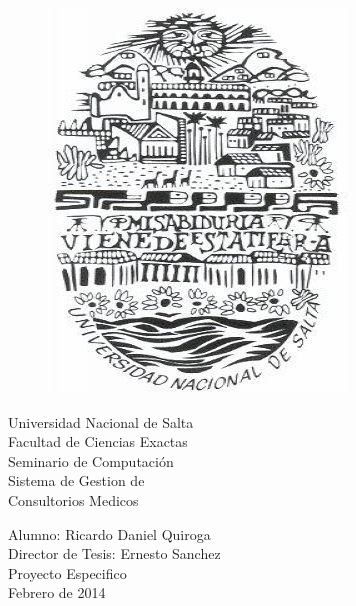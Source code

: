 \documentclass[a4paper,10pt]{report}
\begin{document}
\begin{titlepage}


\begin{center}
    \begin{figure}
        \begin{center}
        \includegraphics[scale=0.5]{resourse/logo-UNSa.jpg}
        \end{center}
    \end{figure} 
\end{center}


\begin{center}
    \LARGE Universidad Nacional de Salta \\
    Facultad de Ciencias Exactas \\
    Seminario de Computaci\'on \\ [2.3cm]
    

    {\fontsize{35}{35} \selectfont 
    Sistema de Gestion de \\ Consultorios Medicos \\[2.3cm] }

\end{center}



\begin{flushright}
    \Large Alumno: Ricardo Daniel Quiroga \\
    Director de Tesis: Ernesto Sanchez \\
    Proyecto Especifico \\ 
    Febrero de 2014 
    
    
\end{flushright}



\end{titlepage}
\end{document}
